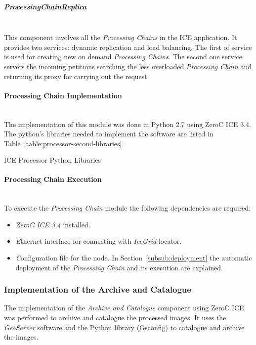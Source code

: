 \subparagraph{ProcessingChainReplica}~\\

This component involves all the \emph{Processing Chains} in the ICE application. It
provides two services: dynamic replication and load balancing. The first
of service is used for creating new on demand \emph{Processing Chains}. The second
one service servers the incoming petitions searching the less overloaded \emph{Processing Chain}
and returning its proxy for carrying out the request.

\paragraph{Processing Chain Implementation}~\\

The implementation of this module was done in Python 2.7 using ZeroC ICE 3.4. The
python's libraries needed to implement the software are listed in
Table~\ref{table:processor-second-libraries}.

\begin{table}[hp]
  \centering
  {\small
  
  }
  \caption{ICE Processor Python Libraries}
  \label{table:processor-second-libraries}
\end{table}

\paragraph{Processing Chain Execution}~\\

To execute the \emph{Processing Chain} module the following dependencies
are required:
\begin{itemize}
\item \emph{ZeroC ICE 3.4} installed.
\item \emph Ethernet interface for connecting with \emph{IceGrid} locator.
\item \emph Configuration file for the node. In Section~\ref{subsub:deployment} the
  automatic deployment of the \emph{Processing Chain} and its execution are explained. 
\end{itemize}

\subsubsection{Implementation of the Archive and Catalogue}

The implementation of the \emph{Archive and Catalogue} component using
ZeroC ICE was
performed to archive and catalogue the processed images. It uses the
\emph{GeoServer} software and the Python library (Gsconfig) to catalogue and
archive the images.

